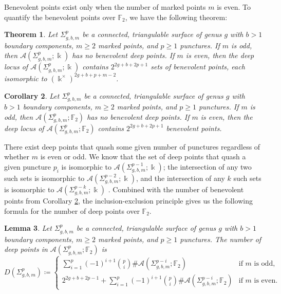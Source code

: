 \documentclass[reqno,12pt]{amsart}
\newtheorem{thm}{Theorem}[section]
\newtheorem{lemma}[thm]{Lemma}
\newtheorem{cor}[thm]{Corollary}
\theoremstyle{definition}
\theoremstyle{remark}
\theoremstyle{remark}
\numberwithin{equation}{section}
\begin{document}
Benevolent points exist only when the number of marked points $m$ is even. To quantify the benevolent points over $\mathbb{F}_2$, we have the following theorem:
\begin{thm}\emph{\cite[Theorem 8.2.9]{BeyerDissertation}}
	Let $\Sigma_{g,b,m}^p$ be a connected, triangulable surface of genus $g$ with $b>1$ boundary components, $m\geq 2$ marked points, and $p\geq 1$ punctures.
	If $m$ is odd, then $\mathcal{A}(\Sigma_{g,b,m}^p ; \Bbbk)$ has no benevolent deep points. If $m$ is even, then the deep locus of $\mathcal{A}(\Sigma_{g,b,m}^p ; \Bbbk)$ contains $2^{2g+b+2p+1}$ sets of benevolent points, each isomorphic to $(\Bbbk^\times )^{2g+b+p+m-2}$.
\end{thm}

\begin{cor}\label{cor: benevolent F2}
	Let $\Sigma_{g,b,m}^p$ be a connected, triangulable surface of genus $g$ with $b>1$ boundary components, $m\geq 2$ marked points, and $p\geq 1$ punctures.
	If $m$ is odd, then $\mathcal{A}(\Sigma_{g,b,m}^p ; \mathbb{F}_2)$ has no benevolent deep points. If $m$ is even, then the deep locus of $\mathcal{A}(\Sigma_{g,b,m}^p ; \mathbb{F}_2)$ contains $2^{2g+b+2p+1}$  benevolent points.
\end{cor}

There exist deep points that quash some given number of punctures regardless of whether $m$ is even or odd. We know that the set of deep points that quash a given puncture $p_i$ is isomorphic to $\mathcal{A}(\Sigma_{g,b,m}^{p-1}; \Bbbk)$; the intersection of any two such sets is isomorphic to $\mathcal{A}(\Sigma_{g,b,m}^{p-2}; \Bbbk)$, and the intersection of any $k$ such sets is isomorphic to $\mathcal{A}(\Sigma_{g,b,m}^{p-k}; \Bbbk)$ \cite[Chapter 8]{BeyerDissertation}. Combined with the number of benevolent points from Corollary \ref{cor: benevolent F2}, the inclusion-exclusion principle gives us the following formula for the number of deep points over $\mathbb{F}_2$.

\begin{lemma}
	Let $\Sigma_{g,b,m}^p$ be a connected, triangulable surface of genus $g$ with $b>1$ boundary components, $m\geq 2$ marked points, and $p\geq 1$ punctures.
	The number of deep points in $\mathcal{A}(\Sigma_{g,b,m}^p ; \mathbb{F}_2)$ is
\begin{displaymath}
	D(\Sigma_{g,b,m}^p) \coloneqq 
	\begin{cases}
		\displaystyle \sum_{i=1}^p (-1)^{i+1}\binom{p}{i} \#\mathcal{A}(\Sigma_{g,b,m}^{p-i} ; \mathbb{F}_2) & \text{if $m$ is odd,} \\
		2^{2g+b+2p-1} + \displaystyle \sum_{i=1}^p (-1)^{i+1}\binom{p}{i} \#\mathcal{A}(\Sigma_{g,b,m}^{p-i} ; \mathbb{F}_2) & \text{if $m$ is even.}
	\end{cases}
\end{displaymath}	
\end{lemma}
\end{document}

